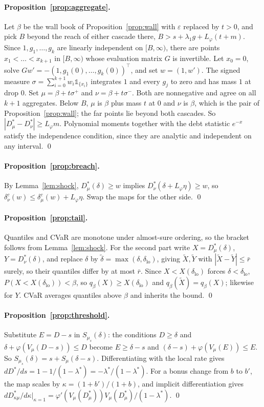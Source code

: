 \documentclass[letterpaper]{article} %
\theoremstyle{remark}
\newcommand{\Dstar}[1]{D^{\ast}_{#1}}
\newcommand{\Lp}{L_\varphi}
\begin{document}
\paragraph{Proposition~\ref{prop:aggregate}.} Let $\beta$ be the wall book of Proposition~\ref{prop:wall} with $\varepsilon$ replaced by $t>0$, and pick $B$ beyond the reach of either cascade there, $B>s+\lambda_1 g+\Lp(t+m)$. Since $1,g_1,\dots,g_k$ are linearly independent on $[B,\infty)$, there are points $x_1<\dots<x_{k+1}$ in $[B,\infty)$ whose evaluation matrix $G$ is invertible. Let $x_0=0$, solve $Gw'=-(1,g_1(0),\dots,g_k(0))^\top$, and set $w=(1,w')$. The signed measure $\sigma=\sum_{i=0}^{k+1}w_i\mathbb{1}_{\{x_i\}}$ integrates $1$ and every $g_j$ to zero and has mass $1$ at drop $0$. Set $\mu=\beta+t\sigma^+$ and $\nu=\beta+t\sigma^-$. Both are nonnegative and agree on all $k+1$ aggregates. Below $B$, $\mu$ is $\beta$ plus mass $t$ at $0$ and $\nu$ is $\beta$, which is the pair of Proposition~\ref{prop:wall}; the far points lie beyond both cascades. So $|\Dstar{\mu}-\Dstar{\nu}|\ge\Lp m$. Polynomial moments together with the debt statistic $e^{-x}$ satisfy the independence condition, since they are analytic and independent on any interval. \qed

\paragraph{Proposition~\ref{prop:breach}.} By Lemma~\ref{lem:shock}, $\Dstar{\mu}(\delta)\ge w$ implies $\Dstar{\nu}(\delta+\Lp\eta)\ge w$, so $\delta^c_\nu(w)\le\delta^c_\mu(w)+\Lp\eta$. Swap the maps for the other side. \qed

\paragraph{Proposition~\ref{prop:tail}.} Quantiles and CVaR are monotone under almost-sure ordering, so the bracket follows from Lemma~\ref{lem:shock}. For the second part write $X=\Dstar{\mu}(\delta)$, $Y=\Dstar{\nu}(\delta)$, and replace $\delta$ by $\tilde\delta=\max(\delta,\delta_{\mathrm{lo}})$, giving $\tilde X,\tilde Y$ with $|\tilde X-\tilde Y|\le\bar r$ surely, so their quantiles differ by at most $\bar r$. Since $X<X(\delta_{\mathrm{lo}})$ forces $\delta<\delta_{\mathrm{lo}}$, $P(X<X(\delta_{\mathrm{lo}}))<\beta$, so $q_\beta(X)\ge X(\delta_{\mathrm{lo}})$ and $q_\beta(\tilde X)=q_\beta(X)$; likewise for $Y$. CVaR averages quantiles above $\beta$ and inherits the bound. \qed

\paragraph{Proposition~\ref{prop:threshold}.} Substitute $E=D-s$ in $S_{\mu_s}(\delta)$: the conditions $D\ge\delta$ and $\delta+\varphi(V_\mu(D-s))\le D$ become $E\ge\delta-s$ and $(\delta-s)+\varphi(V_\mu(E))\le E$. So $S_{\mu_s}(\delta)=s+S_\mu(\delta-s)$. Differentiating with the local rate gives $d\Dstar{}/ds=1-1/(1-\lambda^\ast)=-\lambda^\ast/(1-\lambda^\ast)$. For a bonus change from $b$ to $b'$, the map scales by $\kappa=(1+b')/(1+b)$, and implicit differentiation gives $d\Dstar{\kappa\mu}/d\kappa|_{\kappa=1}=\varphi'(V_\mu(\Dstar{\mu}))V_\mu(\Dstar{\mu})/(1-\lambda^\ast)$. \qed
\end{document}
